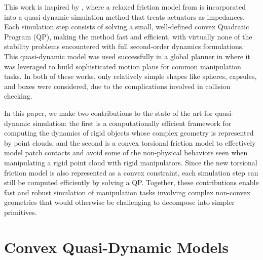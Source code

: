 This work is inspired by \cite{pang2018}, where a relaxed friction model from \cite{anitescu2006} is incorporated into a quasi-dynamic simulation method that treats actuators as impedances. Each simulation step consists of solving a small, well-defined convex Quadratic Program (QP), making the method fast and efficient, with virtually none of the stability problems encountered with full second-order dynamics formulations. This quasi-dynamic model was used successfully in a global planner in \cite{pang2023} where it was leveraged to build sophisticated motion plans for common manipulation tasks. In both of these works, only relatively simple shapes like spheres, capsules, and boxes were considered, due to the complications involved in collision checking.

In this paper, we make two contributions to the state of the art for quasi-dynamic simulation: the first is a computationally efficient framework for computing the dynamics of rigid objects whose complex geometry is represented by point clouds, and the second is a convex torsional friction model to effectively model patch contacts and avoid some of the non-physical behaviors seen when manipulating a rigid point cloud with rigid manipulators. Since the new torsional friction model is also represented as a convex constraint, each simulation step can still be computed efficiently by solving a QP. Together, these contributions enable fast and robust simulation of manipulation tasks involving complex non-convex geometries that would otherwise be challenging to decompose into simpler primitives.
\section{Convex Quasi-Dynamic Models}

